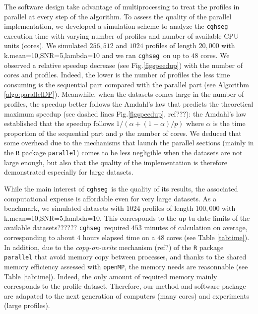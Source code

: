 \documentclass[11pt]{llncs}
\newcommand{\esoft}{\texttt{cghseg }}
\begin{document}
The software design take advantage of multiprocessing to treat the profiles in parallel at every step of the algorithm.
To assess the quality of the parallel implementation, we developed a simulation scheme to analyze the \esoft execution time 
with varying number of profiles and number of available CPU units (cores).
We simulated $256, 512$ and $1024$ profiles of length $20,000$ with k.mean=10,SNR=5,lambda=10 and we ran \esoft on up to $48$ cores.
We observed a relative speedup decrease (see Fig.\ref{figspeedup}) with the number of cores and profiles. Indeed, the lower is the number of profiles the less time consuming is the sequential part compared with the parallel part (see Algorithm \ref{algo:parallelDP}). Meanwhile, when the datasets comes large in the number of profiles, the speedup better follows the Amdahl's law that predicts the theoretical maximum speedup (see dashed lines Fig.\ref{figspeedup}, ref???): the Amdahl's law established that the speedup follows $1/(\alpha+(1-\alpha)/p)$ where $\alpha$ is the time proportion of the sequential part and $p$ the number of cores. We deduced that some overhead due to the mechanisms that launch the parallel sections (mainly in the \texttt{R} package \texttt{parallel}) comes to be less negligible when the datasets are not large enough, but also that the quality of the implementation is therefore demonstrated especially for large datasets.

While the main interest of \esoft is the quality of its results, the associated computational expense is affordable even
for very large datasets. As a benchmark, we simulated datasets with $1024$ profiles of length $100,000$ with k.mean=10,SNR=5,lambda=10. This corresponds to the up-tu-date limits of the available datasets??????
\esoft required $453$ minutes of calculation on average, corresponding to about $4$ hours elapsed time on a $48$ cores (see Table \ref{tabtime}).
In addition, due to the {\it copy-on-write} mechanism (ref?) of the \texttt{R} package \texttt{parallel} that avoid memory copy between processes, and thanks to the shared memory efficiency assessed with \texttt{openMP}, the memory needs are reasonnable (see Table \ref{tabtime}). Indeed, the only amount of required memory mainly corresponds to the profile dataset.
Therefore, our method and software package are adapated to the next generation of computers (many cores) and experiments (large profiles).
\end{document}
